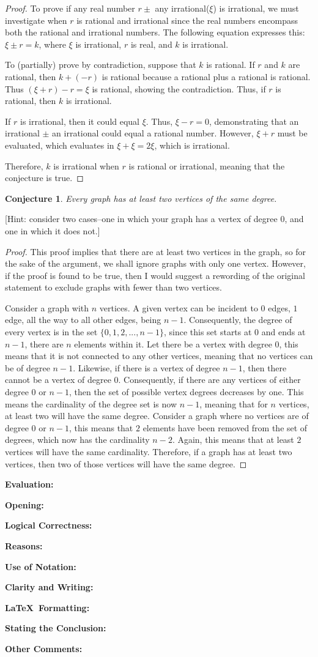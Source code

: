 \documentclass[11pt,titlepage]{article}		%
\def\rubric{\textbf{Evaluation:} \makebox[0.75in]{\hrulefill}

\vspace{.3in}

\textbf{Opening:} \makebox[0.75in]{\hrulefill}

\vspace{.3in}

\textbf{Logical Correctness:} \makebox[0.75in]{\hrulefill}

\vspace{.3in}

\textbf{Reasons:} \makebox[0.75in]{\hrulefill}

\vspace{.3in}

\textbf{Use of Notation:} \makebox[0.75in]{\hrulefill}

\vspace{.3in}

\textbf{Clarity and Writing:} \makebox[0.75in]{\hrulefill}

\vspace{.3in}

\textbf{\LaTeX\ Formatting:} \makebox[0.75in]{\hrulefill}

\vspace{.3in}

\textbf{Stating the Conclusion:} \makebox[0.75in]{\hrulefill}

\vspace{.3in}

\textbf{Other Comments:}

\vspace{1in}

}
\theoremstyle{theorem}
\newtheorem{conjecture}[theorem]{Conjecture}
\begin{document}
\begin{proof}
To prove if any real number $r \pm$ any irrational($\xi$) is irrational, we must investigate when $r$ is rational and irrational since the real numbers encompass both the rational and irrational numbers. The following equation expresses this: $\xi \pm r = k$, where $\xi$ is irrational, $r$ is real, and $k$ is irrational.

To (partially) prove by contradiction, suppose that $k$ is rational. If $r$ and $k$ are rational, then $k +(-r)$ is rational because a rational plus a rational is rational. Thus $(\xi + r) -r = \xi$ is rational, showing the contradiction. Thus, if $r$ is rational, then $k$ is irrational.

If $r$ is irrational, then it could equal $\xi$. Thus, $\xi - r = 0$, demonstrating that an irrational $\pm$ an irrational could equal a rational number. However, $\xi + r$ must be evaluated, which evaluates in $\xi + \xi = 2\xi$, which is irrational.

Therefore, $k$ is irrational when $r$ is rational or irrational, meaning that the conjecture is true.

\end{proof}

\clearpage

\begin{conjecture}
    Every graph has at least two vertices of the same degree.
\end{conjecture}

[Hint: consider two cases--one in which your graph has a vertex of degree 0, and one in which it does not.]

\begin{proof}
This proof implies that there are at least two vertices in the graph, so for the sake of the argument, we shall ignore graphs with only one vertex. However, if the proof is found to be true, then I would suggest a rewording of the original statement to exclude graphs with fewer than two vertices. 

Consider a graph with $n$ vertices. A given vertex can be incident to $0$ edges, $1$ edge, all the way to all other edges, being $n-1$. Consequently, the degree of every vertex is in the set $\{0,1,2,...,n-1\}$, since this set starts at $0$ and ends at $n-1$, there are $n$ elements within it. Let there be a vertex with degree 0, this means that it is not connected to any other vertices, meaning that no vertices can be of degree $n-1$. Likewise, if there is a vertex of degree $n-1$, then there cannot be a vertex of degree $0$. Consequently, if there are any vertices of either degree $0$ or $n-1$, then the set of possible vertex degrees decreases by one. This means the cardinality of the degree set is now $n-1$, meaning that for $n$ vertices, at least two will have the same degree. Consider a graph where no vertices are of degree $0$ or $n-1$, this means that $2$ elements have been removed from the set of degrees, which now has the cardinality $n-2$. Again, this means that at least $2$ vertices will have the same cardinality. Therefore, if a graph has at least two vertices, then two of those vertices will have the same degree.
\end{proof}

\clearpage
\rubric
\end{document}
